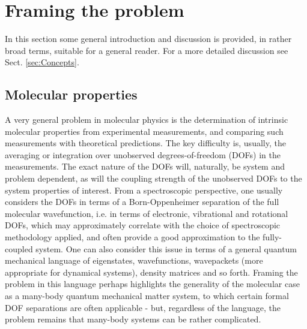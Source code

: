 \section{Framing the problem\label{sec:Framing}}

In this section some general introduction and discussion is provided, in rather broad terms, suitable for a general reader. For a more detailed discussion see Sect. \ref{sec:Concepts}.

\subsection{Molecular properties}
A very general problem in molecular physics is the determination of intrinsic molecular properties from experimental measurements, and comparing such measurements with theoretical predictions. The key difficulty is, usually, the averaging or integration over unobserved degrees-of-freedom (DOFs) in the measurements. The exact nature of the DOFs will, naturally, be system and problem dependent, as will the coupling strength of the unobserved DOFs to the system properties of interest. From a spectroscopic perspective, one usually considers the DOFs in terms of a Born-Oppenheimer separation of the full molecular wavefunction, i.e. in terms of electronic, vibrational and rotational DOFs, which may approximately correlate with the choice of spectroscopic methodology applied, and often provide a good approximation to the fully-coupled system. One can also consider this issue in terms of a general quantum mechanical language of eigenstates, wavefunctions, wavepackets (more appropriate for dynamical systems), density matrices and so forth. Framing the problem in this language perhaps highlights the generality of the molecular case as a many-body quantum mechanical matter system, to which certain formal DOF separations are often applicable - but, regardless of the language, the problem remains that many-body systems can be rather complicated.

